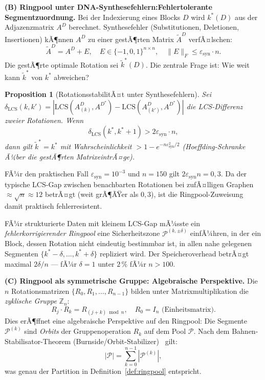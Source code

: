 ﻿\documentclass[a4paper,12pt]{article}
\theoremstyle{definition}
\theoremstyle{plain}
\newtheorem{proposition}{Proposition}[section]
\begin{document}
\textbf{(B) Ringpool unter DNA-Synthesefehlern:\linebreak[2]
  Fehlertolerante Segmentzuordnung.}
Bei der Indexierung eines Blocks $D$ wird $k^*(D)$ aus der Adjazenzmatrix
$A^D$ berechnet.  Synthesefehler (Substitutionen, Deletionen, Insertionen)
kÃ¶nnen $A^D$ zu einer gestÃ¶rten Matrix $\tilde{A}^D$ verfÃ¤lschen:
\[
  \tilde{A}^D = A^D + E, \quad E \in \{-1, 0, 1\}^{n \times n},
  \quad \|E\|_F \le \varepsilon_{\mathrm{syn}} \cdot n.
\]
Die gestÃ¶rte optimale Rotation sei $\tilde{k}^*(D)$.  Die zentrale Frage
ist: Wie weit kann $\tilde{k}^*$ von $k^*$ abweichen?

\begin{proposition}[RotationsstabilitÃ¤t unter Synthesefehlern]
\label{prop:rotation_stabil}
  Sei $\delta_{\mathrm{LCS}}(k, k') = |\mathrm{LCS}(A^D_{(k)}, A^{D^*})
  - \mathrm{LCS}(A^D_{(k')}, A^{D^*})|$ die LCS-Differenz zweier
  Rotationen.  Wenn
  \[
    \delta_{\mathrm{LCS}}(k^*, k^*+1) > 2 \varepsilon_{\mathrm{syn}} \cdot n,
  \]
  dann gilt $\tilde{k}^* = k^*$ mit Wahrscheinlichkeit $> 1 - e^{-n \varepsilon_{\mathrm{syn}}^2/2}$
  (Hoeffding-Schranke Ã¼ber die gestÃ¶rten MatrixeintrÃ¤ge).
\end{proposition}

FÃ¼r den praktischen Fall $\varepsilon_{\mathrm{syn}} = 10^{-3}$ und
$n = 150$ gilt $2 \varepsilon_{\mathrm{syn}} n = 0{,}3$.  Da der typische
LCS-Gap zwischen benachbarten Rotationen bei zufÃ¤lligen Graphen
$\approx \sqrt{n} \approx 12$ betrÃ¤gt (weit grÃ¶ÃŸer als $0{,}3$), ist
die Ringpool-Zuweisung damit praktisch fehlerresistent.

FÃ¼r strukturierte Daten mit kleinem LCS-Gap mÃ¼sste ein
\emph{fehlerkorrigierender Ringpool} eine Sicherheitszone
$\mathcal{P}^{(k,\pm\delta)}$ einfÃ¼hren, in der ein Block, dessen
Rotation nicht eindeutig bestimmbar ist, in allen nahe gelegenen
Segmenten $\{k^*-\delta, \ldots, k^*+\delta\}$ repliziert wird.  Der
Speicheroverhead betrÃ¤gt maximal $2\delta/n$ --- fÃ¼r $\delta = 1$
unter $2\,\%$ fÃ¼r $n > 100$.

\textbf{(C) Ringpool als symmetrische Gruppe: Algebraische Perspektive.}
Die $n$ Rotationsmatrizen $\{R_0, R_1, \ldots, R_{n-1}\}$ bilden unter
Matrixmultiplikation die \emph{zyklische Gruppe} $\mathbb{Z}_n$:
\[
  R_j \cdot R_k = R_{(j+k) \bmod n},
  \quad R_0 = I_n \text{ (Einheitsmatrix)}.
\]
Dies erÃ¶ffnet eine algebraische Perspektive auf den Ringpool:
Die Segmente $\mathcal{P}^{(k)}$ sind \emph{Orbits} der Gruppenoperation
$R_k$ auf dem Pool $\mathcal{P}$.  Nach dem Bahnen-Stabilisator-Theorem
(Burnside/Orbit-Stabilizer)~\cite{knuth1998} gilt:
\[
  |\mathcal{P}| = \sum_{k=0}^{n-1} |\mathcal{P}^{(k)}|,
\]
was genau der Partition in Definition~\ref{def:ringpool} entspricht.
\end{document}
